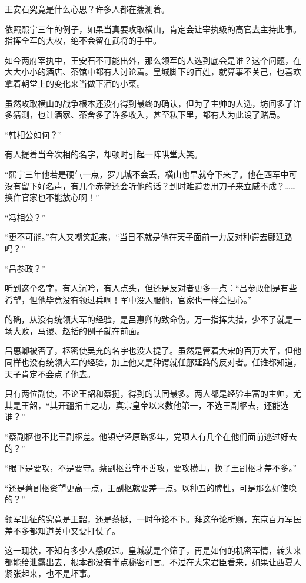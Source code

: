 王安石究竟是什么心思？许多人都在揣测着。

依照熙宁三年的例子，如果当真要攻取横山，肯定会让宰执级的高官去主持此事。指挥全军的大权，绝不会留在武将的手中。

如今两府宰执中，王安石不可能出外，那么领军的人选到底会是谁？这个问题，在大大小小的酒店、茶馆中都有人讨论着。皇城脚下的百姓，就算事不关己，也喜欢拿着朝堂上的变化来当做下酒的小菜。

虽然攻取横山的战争根本还没有得到最终的确认，但为了主帅的人选，坊间多了许多猜测，也让酒家、茶舍多了许多收入，甚至私下里，都有人为此设了赌局。

“韩相公如何？”

有人提着当今次相的名字，却顿时引起一阵哄堂大笑。

“熙宁三年他若是硬气一点，罗兀城不会丢，横山也早就夺下来了。他在西军中可没有留下好名声，有几个赤佬还会听他的话？到时难道要用刀子来立威不成？……换作官家也不能放心啊！”

“冯相公？”

“更不可能。”有人又嘲笑起来，“当日不就是他在天子面前一力反对种谔去鄜延路吗？”

“吕参政？”

听到这个名字，有人沉吟，有人点头，但还是反对者更多一点：“吕参政倒是有些希望，但他毕竟没有领过兵啊！军中没人服他，官家也一样会担心。”

的确，从没有统领大军的经验，是吕惠卿的致命伤。万一指挥失措，少不了就是一场大败，马谡、赵括的例子就在前面。

吕惠卿被否了，枢密使吴充的名字也没人提了。虽然是管着大宋的百万大军，但他同样也没有统领大军的经验，加上他又是种谔就任鄜延路的反对者。任谁都知道，天子肯定不会点了他去。

只有两位副使，不论王韶和蔡挺，得到的认同最多。两人都是经验丰富的主帅，尤其是王韶，“其开疆拓土之功，真宗皇帝以来数他第一，不选王副枢去，还能选谁？”

“蔡副枢也不比王副枢差。他镇守泾原路多年，党项人有几个在他们面前逃过好去的？”

“眼下是要攻，不是要守。蔡副枢善守不善攻，要攻横山，换了王副枢才差不多。”

“还是蔡副枢资望更高一点，王副枢就要差一点。以种五的脾性，可是那么好使唤的？”

领军出征的究竟是王韶，还是蔡挺，一时争论不下。拜这争论所赐，东京百万军民差不多都知道关中又要打仗了。

这一现状，不知有多少人感叹过。皇城就是个筛子，再是如何的机密军情，转头来都能给泄露出去，根本都没有半点秘密可言。不过在大宋君臣看来，如果让西夏人紧张起来，也不是坏事。

